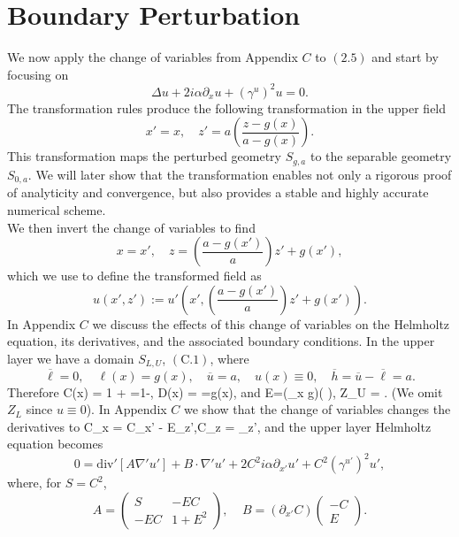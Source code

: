 \section{Boundary Perturbation}
\label{intro:boundary_perturbation}
We now apply the change of variables from Appendix $C$ to $(2.5)$ and start by focusing on 
\begin{equation}\Delta u +2i\alpha\partial_{x}u+(\gamma^u)^2 u=0. \end{equation}
The transformation rules produce the following transformation in the upper field
$$x'=x, \quad z'=a\left(\frac{z-g(x)}{a-g(x)}\right).$$
This transformation maps the perturbed geometry $S_{g,a}$ to the separable geometry $S_{0,a}$. We will later show that the transformation enables not only a rigorous proof of analyticity and convergence, but also provides a stable and highly accurate numerical scheme.
\newline
\\
We then invert the change of variables to find
$$x=x',\quad z = \left(\frac{a-g(x')}{a}\right)z' + g(x'),$$
which we use to define the transformed field as
$$u(x',z'):=u'\left(x',\left(\frac{a-g(x')}{a}\right)z' + g(x')\right).$$
In Appendix $C$ we discuss the effects of this change of variables on the Helmholtz equation, its derivatives, and the associated boundary conditions. In the upper layer we have a domain $S_{L,U}$, $(\text{C}.1)$, where
$$\overline{\ell}=0,\quad \ell(x)=g(x), \quad \overline{u}=a, \quad u(x) \equiv 0,\quad \overline{h}=\overline{u}-\overline{\ell}=a.$$
Therefore
\bes
C(x) = 1 + =1-, \quad
D(x) = =g(x),
\ees
and
\bes
E=(\partial_x g)\left( \right), \quad Z_U = .
\ees
(We omit $Z_L$ since $u\equiv 0$). In Appendix $C$ we show that the change of variables changes the derivatives to
\bes
C\partial_x = C\partial_{x'} - E\partial_{z'},\quad C\partial_z = \partial_{z'},
\ees
and the upper layer Helmholtz equation becomes
\begin{equation*}0=\text{div}'[A\nabla' u']+B\cdot \nabla' u' +2C^2i\alpha\partial_{x'}u'+C^2(\gamma^{u'})^2u',\end{equation*}
where, for $S=C^2$,
$$A=\begin{pmatrix}
    S & -EC\\
    -EC & 1+E^2
  \end{pmatrix}, ~~~~~
  B=(\partial_{x'}C)\begin{pmatrix}
    -C\\
    E
  \end{pmatrix}.
$$
